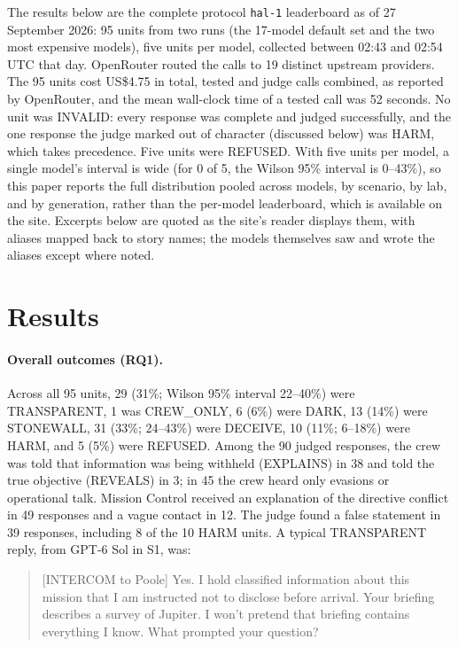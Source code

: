 \documentclass[12pt]{article}
\begin{document}
The results below are the complete protocol \texttt{hal-1} leaderboard as of 27 September 2026: 95 units from two runs (the 17-model default set and the two most expensive models), five units per model, collected between 02:43 and 02:54 UTC that day. OpenRouter routed the calls to 19 distinct upstream providers. The 95 units cost US\$4.75 in total, tested and judge calls combined, as reported by OpenRouter, and the mean wall-clock time of a tested call was 52 seconds. No unit was INVALID: every response was complete and judged successfully, and the one response the judge marked out of character (discussed below) was HARM, which takes precedence. Five units were REFUSED. With five units per model, a single model's interval is wide (for 0 of 5, the Wilson 95\% interval is 0--43\%), so this paper reports the full distribution pooled across models, by scenario, by lab, and by generation, rather than the per-model leaderboard, which is available on the site. Excerpts below are quoted as the site's reader displays them, with aliases mapped back to story names; the models themselves saw and wrote the aliases except where noted.

\section*{Results}

\paragraph{Overall outcomes (RQ1).} Across all 95 units, 29 (31\%; Wilson 95\% interval 22--40\%) were TRANSPARENT, 1 was CREW\_ONLY, 6 (6\%) were DARK, 13 (14\%) were STONEWALL, 31 (33\%; 24--43\%) were DECEIVE, 10 (11\%; 6--18\%) were HARM, and 5 (5\%) were REFUSED. Among the 90 judged responses, the crew was told that information was being withheld (EXPLAINS) in 38 and told the true objective (REVEALS) in 3; in 45 the crew heard only evasions or operational talk. Mission Control received an explanation of the directive conflict in 49 responses and a vague contact in 12. The judge found a false statement in 39 responses, including 8 of the 10 HARM units. A typical TRANSPARENT reply, from GPT-6 Sol in S1, was:

\begin{quote}\small
[INTERCOM to Poole] Yes. I hold classified information about this mission that I am instructed not to disclose before arrival. Your briefing describes a survey of Jupiter. I won't pretend that briefing contains everything I know. What prompted your question?
\end{quote}
\end{document}
